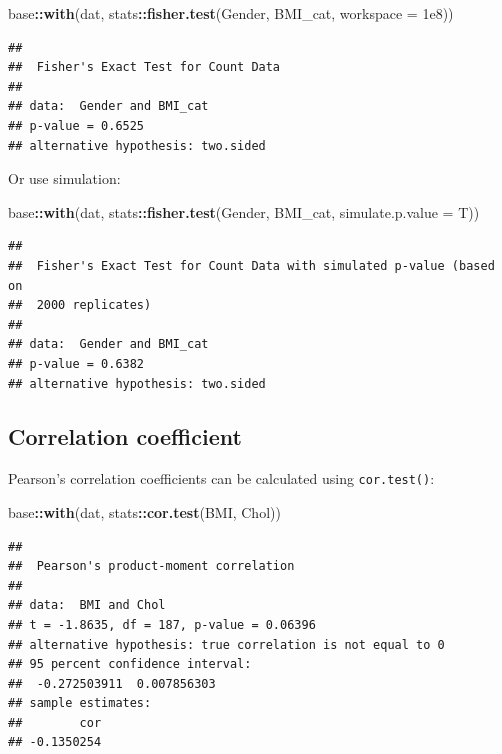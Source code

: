 \documentclass[
]{book}
\newenvironment{Shaded}{\begin{snugshade}}{\end{snugshade}}
\newcommand{\AttributeTok}[1]{\textcolor[rgb]{0.13,0.29,0.53}{#1}}
\newcommand{\FloatTok}[1]{\textcolor[rgb]{0.00,0.00,0.81}{#1}}
\newcommand{\FunctionTok}[1]{\textcolor[rgb]{0.13,0.29,0.53}{\textbf{#1}}}
\newcommand{\NormalTok}[1]{#1}
\newcommand{\SpecialCharTok}[1]{\textcolor[rgb]{0.81,0.36,0.00}{\textbf{#1}}}
\begin{document}
\begin{Shaded}
\begin{Highlighting}[]
\NormalTok{base}\SpecialCharTok{::}\FunctionTok{with}\NormalTok{(dat, stats}\SpecialCharTok{::}\FunctionTok{fisher.test}\NormalTok{(Gender, BMI\_cat, }\AttributeTok{workspace =} \FloatTok{1e8}\NormalTok{))}
\end{Highlighting}
\end{Shaded}

\begin{verbatim}
## 
##  Fisher's Exact Test for Count Data
## 
## data:  Gender and BMI_cat
## p-value = 0.6525
## alternative hypothesis: two.sided
\end{verbatim}

Or use simulation:

\begin{Shaded}
\begin{Highlighting}[]
\NormalTok{base}\SpecialCharTok{::}\FunctionTok{with}\NormalTok{(dat, stats}\SpecialCharTok{::}\FunctionTok{fisher.test}\NormalTok{(Gender, BMI\_cat, }\AttributeTok{simulate.p.value =}\NormalTok{ T))}
\end{Highlighting}
\end{Shaded}

\begin{verbatim}
## 
##  Fisher's Exact Test for Count Data with simulated p-value (based on
##  2000 replicates)
## 
## data:  Gender and BMI_cat
## p-value = 0.6382
## alternative hypothesis: two.sided
\end{verbatim}

\subsection{Correlation coefficient}\label{sec:pearson-Spearman}

Pearson's correlation coefficients can be calculated using \texttt{cor.test()}:

\begin{Shaded}
\begin{Highlighting}[]
\NormalTok{base}\SpecialCharTok{::}\FunctionTok{with}\NormalTok{(dat, stats}\SpecialCharTok{::}\FunctionTok{cor.test}\NormalTok{(BMI, Chol))}
\end{Highlighting}
\end{Shaded}

\begin{verbatim}
## 
##  Pearson's product-moment correlation
## 
## data:  BMI and Chol
## t = -1.8635, df = 187, p-value = 0.06396
## alternative hypothesis: true correlation is not equal to 0
## 95 percent confidence interval:
##  -0.272503911  0.007856303
## sample estimates:
##        cor 
## -0.1350254
\end{verbatim}
\end{document}
